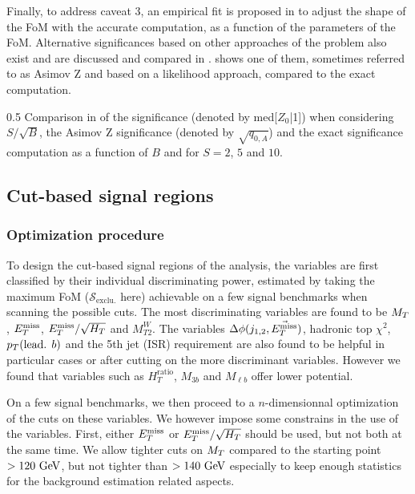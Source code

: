     Finally, to address caveat 3, an empirical fit is proposed in \cite{Punzi} to adjust the
    shape of the FoM with the accurate computation, as a function of the parameters
    of the FoM. Alternative significances based on other approaches of the problem also
    exist and are discussed and compared in \cite{FOMLinnemann, FOMCousins, FOMCowan}.
     shows one of them, sometimes referred to as Asimov Z and based on a
    likelihood approach, compared to the exact computation.

                 {0.5}
                 {Comparison in \cite{FOMCowan} of the significance (denoted by med[$Z_0$|1])
                 when considering $S/\sqrt{B}$, the Asimov Z significance (denoted by $\sqrt{q_{0,A}}$) and
                 the exact significance computation as a function of $B$ and for $S = 2$, $5$ and $10$.}

        \subsection{Cut-based signal regions}

            \subsubsection{Optimization procedure}

    To design the cut-based signal regions of the analysis, the variables are first
    classified by their individual discriminating power, estimated by taking the
    maximum FoM ($\mathcal{S}_\text{exclu.}$ here) achievable on a few signal benchmarks when scanning the possible
    cuts. The most discriminating variables are found to be $M_T$, $E_T^\text{miss}$,
    $E_T^\text{miss}/\sqrt{H_T}$ and $M_{T2}^{W}$. The variables $\Delta \phi(j_{1,2},\vec{E_T^\text{miss}})$,
    hadronic top $\chi^2$, $p_T(\text{lead. } b)$ and the 5th jet (ISR) requirement are
    also found to be helpful in particular cases or after cutting on the more discriminant
    variables. However we found that variables such as $H_T^\text{ratio}$, $M_{3b}$ and
    $M_{\ell b}$ offer lower potential.

    On a few signal benchmarks, we then proceed to a $n$-dimensionnal optimization of the
    cuts on these variables. We however impose some constrains in the use of the variables.
    First, either $E_T^\text{miss}$ or $E_T^\text{miss}/\sqrt{H_T}$ should be used, but not both at the same time.
    We allow tighter cuts on $M_T$ compared to the starting point $> 120~\text{GeV}$, but not
    tighter than $> 140~\text{GeV}$ especially to keep enough statistics for the background
    estimation related aspects.

